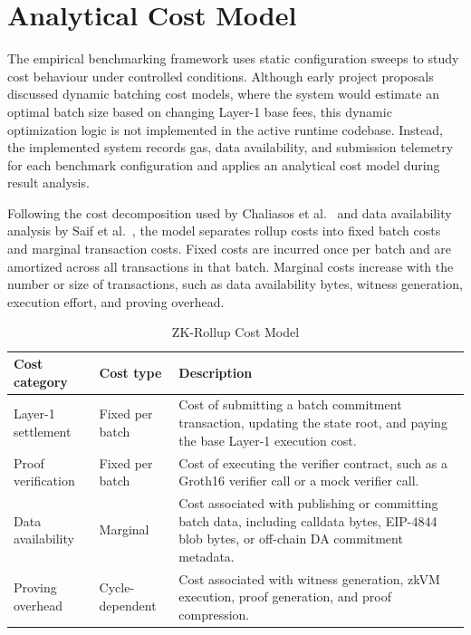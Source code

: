 
\section{Analytical Cost Model}
\label{sec:cost_models}

The empirical benchmarking framework uses static configuration sweeps to study cost behaviour under controlled conditions. Although early project proposals discussed dynamic batching cost models, where the system would estimate an optimal batch size based on changing Layer-1 base fees, this dynamic optimization logic is not implemented in the active runtime codebase. Instead, the implemented system records gas, data availability, and submission telemetry for each benchmark configuration and applies an analytical cost model during result analysis.


Following the cost decomposition used by Chaliasos et al.~\citep{chaliasos2024analyzing} and data availability analysis by Saif et al.~\citep{saif2024dataavailability}, the model separates rollup costs into fixed batch costs and marginal transaction costs. Fixed costs are incurred once per batch and are amortized across all transactions in that batch. Marginal costs increase with the number or size of transactions, such as data availability bytes, witness generation, execution effort, and proving overhead.

\begin{table}[!htbp]
\centering
\caption{ZK-Rollup Cost Model}
\label{tab:zk_rollup_cost_model}
\footnotesize
\setlength{\tabcolsep}{4pt}
\renewcommand{\arraystretch}{1.18}
\begin{tabularx}{\textwidth}{@{}p{}p{}Y@{}}
\toprule
\textbf{Cost category} & \textbf{Cost type} & \textbf{Description} \\
\midrule

Layer-1 settlement 
& Fixed per batch 
& Cost of submitting a batch commitment transaction, updating the state root, and paying the base Layer-1 execution cost. \\

\addlinespace

Proof verification 
& Fixed per batch 
& Cost of executing the verifier contract, such as a Groth16 verifier call or a mock verifier call. \\

\addlinespace

Data availability 
& Marginal 
& Cost associated with publishing or committing batch data, including calldata bytes, EIP-4844 blob bytes, or off-chain DA commitment metadata. \\

\addlinespace

Proving overhead 
& Cycle-dependent 
& Cost associated with witness generation, zkVM execution, proof generation, and proof compression. \\

\bottomrule
\end{tabularx}
\normalsize
\end{table}

